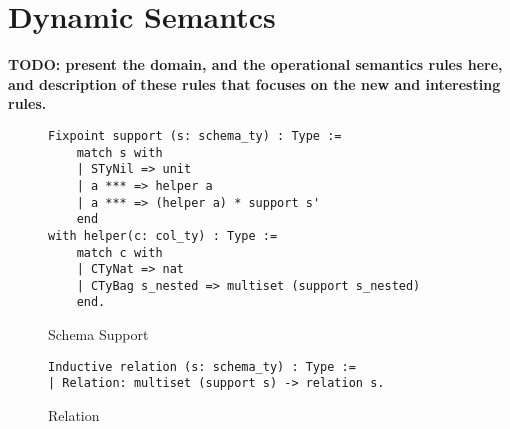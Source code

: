 \section{Dynamic Semantcs}
\label{sec:semantics}

{\bf TODO: present the domain, and the operational semantics rules here, 
and description of these rules that focuses on the new and interesting rules.}

\begin{figure}
\begin{center}
\begin{lstlisting}
Fixpoint support (s: schema_ty) : Type :=
	match s with
  	| STyNil => unit
  	| a *** => helper a
  	| a *** => (helper a) * support s'
  	end
with helper(c: col_ty) : Type :=
	match c with
	| CTyNat => nat
	| CTyBag s_nested => multiset (support s_nested)
	end.
\end{lstlisting}
\end{center}
\caption{Schema Support}
\label{fig-schema_support}
\end{figure}

\begin{figure}
\begin{center}
\begin{lstlisting}
Inductive relation (s: schema_ty) : Type := 
| Relation: multiset (support s) -> relation s.
\end{lstlisting}
\end{center}
\caption{Relation}
\label{fig-relation}
\end{figure}

